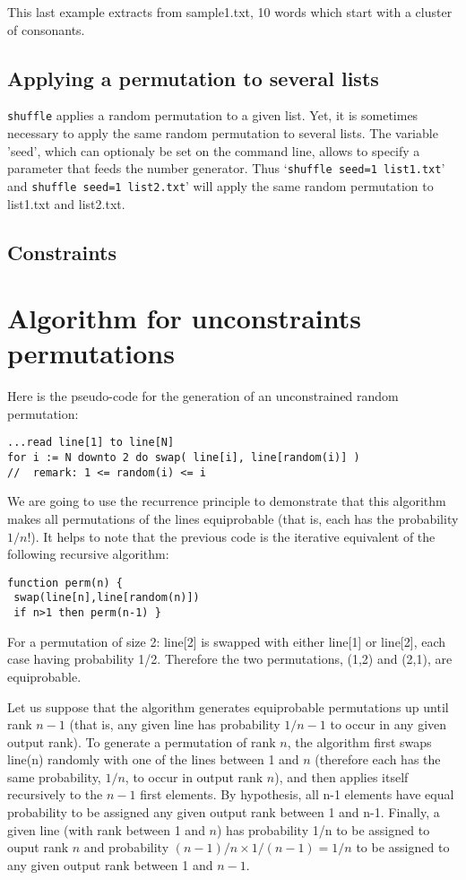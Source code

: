 \documentclass[doc]{apa}
\newcommand{\shuffle}{\texttt{shuffle}}
\begin{document}
This last example extracts from sample1.txt, 10 words which start with a
cluster of consonants.

\subsection*{Applying a permutation to several lists}

\shuffle{} applies a random permutation to a given list. Yet, it is
sometimes necessary to apply the same random permutation to several
lists. The variable 'seed', which can optionaly be set on the command
line, allows to specify a parameter that feeds the number generator.
Thus `\verb|shuffle seed=1 list1.txt|' and \verb|shuffle seed=1 list2.txt|' will apply the same random permutation to list1.txt and
list2.txt.

\subsection*{Constraints}


\section*{Algorithm for unconstraints permutations}

Here is the pseudo-code for the generation of an unconstrained
random permutation:

\begin{verbatim}
...read line[1] to line[N]
for i := N downto 2 do swap( line[i], line[random(i)] )
//  remark: 1 <= random(i) <= i
\end{verbatim}

We are going to use the recurrence principle to demonstrate that this
algorithm makes all permutations of the lines equiprobable (that is,
each has the probability $1/n!$). It helps to note that the
previous code is the iterative equivalent of the following recursive
algorithm:

\begin{verbatim}
function perm(n) {
 swap(line[n],line[random(n)])
 if n>1 then perm(n-1) }
\end{verbatim}

For a permutation of size 2: line[2] is swapped with either line[1] or
line[2], each case having probability 1/2. Therefore the two
permutations, (1,2) and (2,1), are equiprobable.
 
Let us suppose that the algorithm generates equiprobable permutations
up until rank $n-1$ (that is, any given line has probability $1/n-1$
to occur in any given output rank). To generate a permutation of rank
$n$, the algorithm first swaps line(n) randomly with one of the lines
between 1 and $n$ (therefore each has the same probability, $1/n$, to
occur in output rank $n$), and then applies itself recursively to the
$n-1$ first elements. By hypothesis, all n-1 elements have equal
probability to be assigned any given output rank between 1 and n-1.
Finally, a given line (with rank between 1 and $n$) has probability
1/n to be assigned to ouput rank $n$ and probability $(n-1)/n \times
1/(n-1)=1/n$ to be assigned to any given output rank between 1 and
$n-1$.
\end{document}
